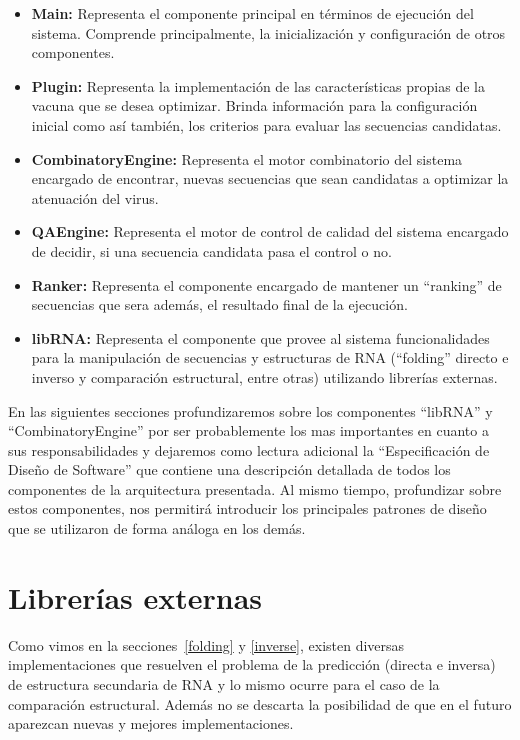 \begin{itemize}
   \item \textbf{Main:} Representa el componente principal en t\'erminos de
ejecuci\'on del sistema. Comprende principalmente, la inicializaci\'on y
configuraci\'on de otros componentes.
   \item \textbf{Plugin:} Representa la implementaci\'on de las
caracter\'isticas propias de la vacuna que se desea optimizar. Brinda
informaci\'on para la configuraci\'on inicial como as\'i tambi\'en, los
criterios para evaluar las secuencias candidatas.
   \item \textbf{CombinatoryEngine:} Representa el motor combinatorio del
sistema encargado de encontrar, nuevas secuencias que sean candidatas a
optimizar la atenuaci\'on del virus.
   \item \textbf{QAEngine:} Representa el motor de control de calidad del
sistema encargado de decidir, si una secuencia candidata pasa el control o no.
   \item \textbf{Ranker:} Representa el componente encargado de mantener un
``ranking'' de secuencias que sera adem\'as, el resultado final de la
ejecuci\'on.
   \item \textbf{libRNA:} Representa el componente que provee al sistema
funcionalidades para la manipulaci\'on de secuencias y estructuras de \ac{RNA}
(``folding'' directo e inverso y comparaci\'on estructural, entre otras)
utilizando librer\'ias externas.
  \end{itemize}

En las siguientes secciones profundizaremos sobre los componentes ``libRNA'' y
``CombinatoryEngine'' por ser probablemente los mas importantes en cuanto a sus
responsabilidades y dejaremos como lectura adicional la ``Especificaci\'on de
Dise\~no de Software'' que contiene una descripci\'on detallada de todos los
componentes de la arquitectura presentada. Al mismo tiempo, profundizar sobre
estos componentes, nos permitir\'a introducir los principales patrones de
dise\~no que se utilizaron de forma an\'aloga en los dem\'as.

\section{Librer\'ias externas}

Como vimos en la secciones~\ref{folding} y \ref{inverse}, existen diversas
implementaciones que resuelven el problema de la predicci\'on (directa e
inversa) de estructura secundaria de \ac{RNA} y lo mismo ocurre para el caso de
la comparaci\'on estructural. Adem\'as no se descarta la posibilidad de que en
el futuro aparezcan nuevas y mejores implementaciones. 

